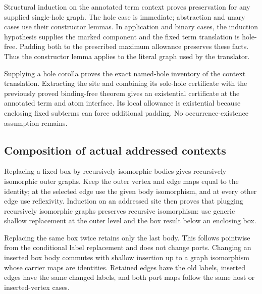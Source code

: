 

Structural induction on the annotated term context proves preservation
for any supplied single-hole graph. The hole case is immediate; abstraction
and unary cases use their constructor lemmas. In application and binary
cases, the induction hypothesis supplies the marked component and the fixed
term translation is hole-free. Padding both to the prescribed maximum
allowance preserves these facts. Thus the constructor lemma applies to the
literal graph used by the translator.

Supplying a hole corolla proves the exact named-hole inventory of the context
translation. Extracting the site and combining its sole-hole certificate
with the previously proved binding-free theorem gives an existential
certificate at the annotated term and atom interface. Its local allowance
is existential because enclosing fixed subterms can force additional padding.
No occurrence-existence assumption remains.







\subsection{Composition of actual addressed contexts}


Replacing a fixed box by recursively isomorphic bodies gives recursively
isomorphic outer graphs. Keep the outer vertex and edge maps equal to the
identity; at the selected edge use the given body isomorphism, and at every
other edge use reflexivity. Induction on an addressed site then proves that
plugging recursively isomorphic graphs preserves recursive isomorphism:
use generic shallow replacement at the outer level and the box result below
an enclosing box.

Replacing the same box twice retains only the last body. This follows
pointwise from the conditional label replacement and does not change ports.
Changing an inserted box body commutes with shallow insertion up to a graph
isomorphism whose carrier maps are identities. Retained edges have the old
labels, inserted edges have the same changed labels, and both port maps
follow the same host or inserted-vertex cases.

